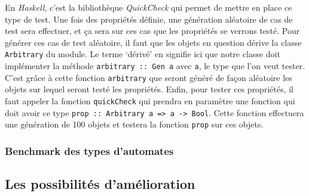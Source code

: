 \vphantom{}

En \textit{Haskell}, c'est la bibliothèque \textit{QuickCheck} qui permet de 
mettre en place ce type de test. Une fois des propriétés définie, une génération 
aléatoire de cas de test sera effectuer, et ça sera sur ces cas que les 
propriétés se verrons testé. Pour générer ces cas de test aléatoire, il faut 
que les objets en question dérive la classe \texttt{Arbitrary} du 
module. Le terme `dérivé' en signifie ici que notre classe doit implémenter la 
méthode \texttt{arbitrary :: Gen a} avec \texttt{a}, 
le type que l'on veut tester. C'est grâce à cette fonction 
\texttt{arbitrary} que seront généré de façon aléatoire les objets 
sur lequel seront testé les propriétés. Enfin, pour tester ces propriétés, il 
faut appeler la fonction \texttt{quickCheck} qui prendra en 
paramètre une fonction qui doit avoir ce type 
\texttt{prop :: Arbitrary a => a -> Bool}. Cette fonction 
effectuera une génération de 100 objets et testera la fonction 
\texttt{prop} sur ces objets.

\vphantom{}



\subsubsection{Benchmark des types d'automates}


\vphantom{}



\subsection{Les possibilités d'amélioration}
